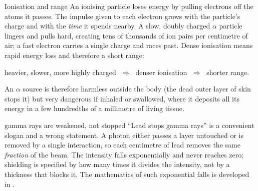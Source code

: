 \begin{figure}[htbp]
\centering
{}
\end{figure}

\begin{keybox}{Ionisation and range}
An ionising particle loses energy by pulling electrons off the atoms it passes. The impulse given to each
electron grows with the particle's charge and with the \emph{time} it spends nearby. A slow, doubly charged
$\alpha$ particle lingers and pulls hard, creating tens of thousands of ion pairs per centimetre of air; a
fast electron carries a single charge and races past. Dense ionisation means rapid energy loss and therefore
a short range:
\begin{center}
heavier, slower, more highly charged $\;\Longrightarrow\;$ denser ionisation $\;\Longrightarrow\;$ shorter range.
\end{center}
An $\alpha$ source is therefore harmless outside the body (the dead outer layer of skin stops it) but very
dangerous if inhaled or swallowed, where it deposits all its energy in a few hundredths of a millimetre of
living tissue.
\end{keybox}

\begin{trapbox}{gamma rays are weakened, not stopped}
``Lead stops gamma rays'' is a convenient slogan and a wrong statement. A photon either passes a layer
untouched or is removed by a single interaction, so each centimetre of lead removes the same
\emph{fraction} of the beam. The intensity falls exponentially and never reaches zero; shielding is
specified by how many times it divides the intensity, not by a thickness that blocks it. The
mathematics of such exponential falls is developed in .
\end{trapbox}

